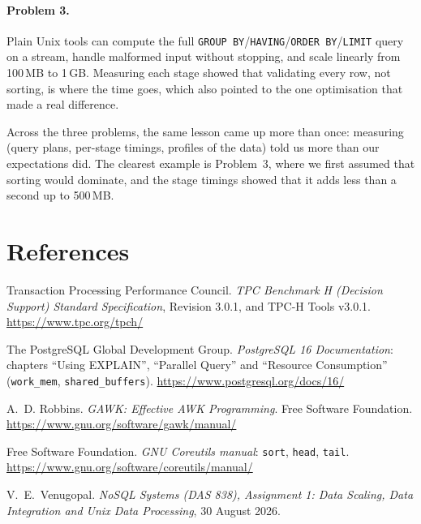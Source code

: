 \documentclass[11pt,a4paper]{article}
\begin{document}
\paragraph{Problem 3.} Plain Unix tools can compute the full
\texttt{GROUP BY}/\texttt{HAVING}/\texttt{ORDER BY}/\texttt{LIMIT} query on a
stream, handle malformed input without stopping, and scale linearly from
100\,MB to 1\,GB. Measuring each stage showed that validating every row, not
sorting, is where the time goes, which also pointed to the one optimisation
that made a real difference.

Across the three problems, the same lesson came up more than once: measuring
(query plans, per-stage timings, profiles of the data) told us more than our
expectations did. The clearest example is Problem~3, where we first assumed
that sorting would dominate, and the stage timings showed that it adds less
than a second up to 500\,MB.

\section*{References}

\begin{enumerate}[label={[\arabic*]}, leftmargin=2.2em]
\item Transaction Processing Performance Council. \emph{TPC Benchmark H
(Decision Support) Standard Specification}, Revision 3.0.1, and TPC-H Tools
v3.0.1. \url{https://www.tpc.org/tpch/}
\item The PostgreSQL Global Development Group. \emph{PostgreSQL 16
Documentation}: chapters ``Using EXPLAIN'', ``Parallel Query'' and
``Resource Consumption'' (\texttt{work\_mem}, \texttt{shared\_buffers}).
\url{https://www.postgresql.org/docs/16/}
\item A.~D. Robbins. \emph{GAWK: Effective AWK Programming}. Free Software
Foundation. \url{https://www.gnu.org/software/gawk/manual/}
\item Free Software Foundation. \emph{GNU Coreutils manual}: \texttt{sort},
\texttt{head}, \texttt{tail}. \url{https://www.gnu.org/software/coreutils/manual/}
\item V.~E.~Venugopal. \emph{NoSQL Systems (DAS 838), Assignment 1: Data
Scaling, Data Integration and Unix Data Processing}, 30 August 2026.
\end{enumerate}

\end{document}
